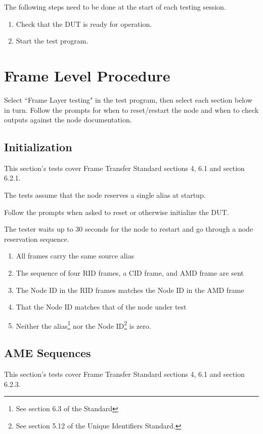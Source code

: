 \documentclass[11pt]{article}
\begin{document}
The following steps need to be done at the start of each testing session.
\begin{enumerate}
\item Check that the DUT is ready for operation.
\item Start the test program.
\end{enumerate}

\section{Frame Level Procedure}

Select ``Frame Layer testing" in the test program, 
then select each section below in turn.  Follow the prompts
for when to reset/restart the node and when to check 
outputs against the node documentation.

\subsection{Initialization}

This section's tests cover Frame Transfer Standard sections 4, 6.1 and section 6.2.1.

The tests assume that the node reserves a single alias at startup.

Follow the prompts when asked to reset or otherwise initialize the DUT.

The tester waits up to 30 seconds for the node to restart and 
go through a node reservation sequence.

\begin{enumerate}
\item All frames carry the same source alias
\item The sequence of four RID frames, a CID frame, and AMD frame are sent
\item The Node ID in the RID frames matches the Node ID in the AMD frame
\item That the Node ID matches that of the node under test
\item Neither the alias\footnote{See section 6.3 of the Standard} 
nor the Node ID\footnote{See section 5.12 of the Unique Identifiers Standard.}
is zero.
\end{enumerate}


\subsection{AME Sequences}

This section's tests cover Frame Transfer Standard sections 4, 6.1 and section 6.2.3.
\end{document}

